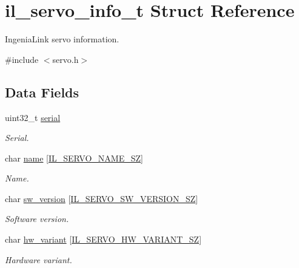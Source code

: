 \hypertarget{structil__servo__info__t}{}\section{il\+\_\+servo\+\_\+info\+\_\+t Struct Reference}
\label{structil__servo__info__t}


Ingenia\+Link servo information.  




{\ttfamily \#include $<$servo.\+h$>$}

\subsection*{Data Fields}
\begin{DoxyCompactItemize}
\item 
uint32\+\_\+t \hyperlink{structil__servo__info__t_a0ae637a9d167672496e381e23c5cd5d5}{serial}
\begin{DoxyCompactList}\small\item\em Serial. \end{DoxyCompactList}\item 
char \hyperlink{structil__servo__info__t_a1499b7681107bb0310f353615f9ea6d6}{name} \mbox{[}\hyperlink{group__IL__SERVO_ga0a684ea427841d8ba4cf87b2d9a94d97}{I\+L\+\_\+\+S\+E\+R\+V\+O\+\_\+\+N\+A\+M\+E\+\_\+\+SZ}\mbox{]}
\begin{DoxyCompactList}\small\item\em Name. \end{DoxyCompactList}\item 
char \hyperlink{structil__servo__info__t_ad08af6ad43a8c261812fa9775bc4fc08}{sw\+\_\+version} \mbox{[}\hyperlink{group__IL__SERVO_gaec19ad2892772d99664f16c55b9bc43f}{I\+L\+\_\+\+S\+E\+R\+V\+O\+\_\+\+S\+W\+\_\+\+V\+E\+R\+S\+I\+O\+N\+\_\+\+SZ}\mbox{]}
\begin{DoxyCompactList}\small\item\em Software version. \end{DoxyCompactList}\item 
char \hyperlink{structil__servo__info__t_abd47e38a9b25fd17f1dfb09341a83c93}{hw\+\_\+variant} \mbox{[}\hyperlink{group__IL__SERVO_ga18d9729ab800ffdda8ec81d8146a7e3f}{I\+L\+\_\+\+S\+E\+R\+V\+O\+\_\+\+H\+W\+\_\+\+V\+A\+R\+I\+A\+N\+T\+\_\+\+SZ}\mbox{]}
\begin{DoxyCompactList}\small\item\em Hardware variant. \end{DoxyCompactList}\item 

\end{DoxyCompactItemize}
